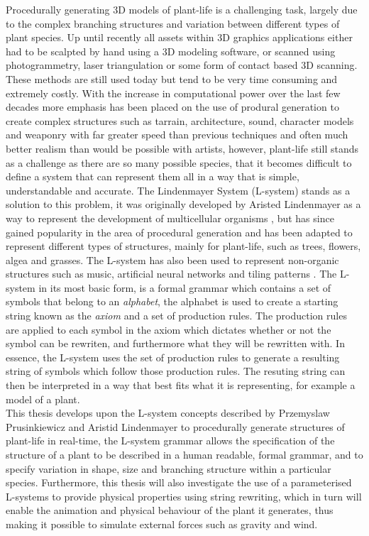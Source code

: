 
\lettrine[lines=3]{P}{}rocedurally generating 3D models of plant-life is a challenging task, largely due to the complex branching structures and variation between different types of plant species. Up until recently all assets within 3D graphics applications either had to be scalpted by hand using a 3D modeling software, or scanned using photogrammetry, laser triangulation or some form of contact based 3D scanning. These methods are still used today but tend to be very time consuming and extremely costly. With the increase in computational power over the last few decades more emphasis has been placed on the use of produral generation to create complex structures such as tarrain, architecture, sound, character models and weaponry with far greater speed than previous techniques and often much better realism than would be possible with artists, however, plant-life still stands as a challenge as there are so many possible species, that it becomes difficult to define a system that can represent them all in a way that is simple, understandable and accurate. The Lindenmayer System (L-system) stands as a solution to this problem, it was originally developed by Aristed Lindenmayer as a way to represent the development of multicellular organisms \cite{lindenmayer1968mathematical}, but has since gained popularity in the area of procedural generation and has been adapted to represent different types of structures, mainly for plant-life, such as trees, flowers, algea and grasses. The L-system has also been used to represent non-organic structures such as music, artificial neural networks and tiling patterns \cite{Prusinkiewicz1989}. The L-system in its most basic form, is a formal grammar which contains a set of symbols that belong to an \textit{alphabet}, the alphabet is used to create a starting string known as the \textit{axiom} and a set of production rules. The production rules are applied to each symbol in the axiom which dictates whether or not the symbol can be rewriten, and furthermore what they will be rewritten with. In essence, the L-system uses the set of production rules to generate a resulting string of symbols which follow those production rules. The resuting string can then be interpreted in a way that best fits what it is representing, for example a model of a plant. \\

This thesis develops upon the L-system concepts described by Przemyslaw Prusinkiewicz and Aristid Lindenmayer to procedurally generate structures of plant-life in real-time, the L-system grammar allows the specification of the structure of a plant to be described in a human readable, formal grammar, and to specify variation in shape, size and branching structure within a particular species. Furthermore, this thesis will also investigate the use of a parameterised L-systems to provide physical properties using string rewriting, which in turn will enable the animation and physical behaviour of the plant it generates, thus making it possible to simulate external forces such as gravity and wind.

